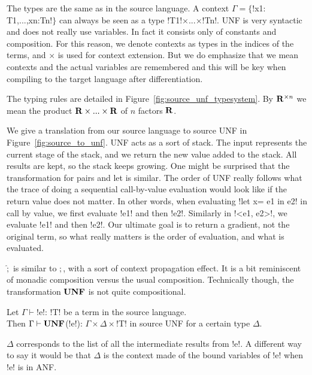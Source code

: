 The types are the same as in the source language. 
A context $\Gamma=\{$!x1: T1,...,xn:Tn!$\}$ can always be seen as a type !T1!$\times$...$\times$!Tn!.
UNF is very syntactic and does not really use variables. 
In fact it consists only of constants and composition. 
For this reason, we denote contexts as types in the indices of the terms, and $\times$ is used for context extension.
But we do emphasize that we mean contexts and the actual variables are remembered and
this will be key when compiling to the target language after differentiation. 

The typing rules are detailed in Figure~\ref{fig:source_unf_typesystem}.
By $\mathbf{R}^{\times n}$ we mean the product $\mathbf{R}\times...\times\mathbf{R}$ of $n$ factors $\mathbf{R}$.




We give a translation from our source language to source UNF in Figure~\ref{fig:source_to_unf}.
UNF acts as a sort of stack. 
The input represents the current stage of the stack, and we return the new value added to the stack.
All results are kept, so the stack keeps growing. One might be surprised that the transformation for pairs and let is similar.
The order of UNF really follows what the trace of doing a sequential call-by-value evaluation would look like if the return value does not matter.
In other words, when evaluating !let x= e1 in e2! in call by value, we first evaluate !e1! and then !e2!. 
Similarly in !<e1, e2>!, we evaluate !e1! and then !e2!. 
Our ultimate goal is to return a gradient, not the original term, so what really matters is the order of evaluation, and what is evaluated.

$\widehat{;}$ is similar to $;$, with a sort of context propagation effect. 
It is a bit reminiscent of monadic composition versus the usual composition.
Technically though, the transformation $\mathbf{UNF}$ is not quite compositional.

\begin{proposition}
    Let $\Gamma\vdash$!e!: !T! be a term in the source language.\\
    Then $\Gamma \vdash \mathbf{UNF}$(!e!): $\Gamma\times\Delta\times$!T! in source UNF for a certain type $\Delta$. 
\end{proposition}

$\Delta$ corresponds to the list of all the intermediate results from !e!. 
A different way to say it would be that $\Delta$ is the context made of the bound variables of !e! when !e! is in ANF.


